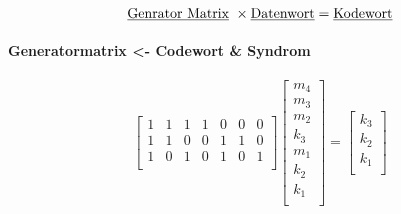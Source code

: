 \documentclass[a4paper]{scrartcl}
\begin{document}
					\[ \text{\underline{Genrator Matrix} }\times \text{\underline{Datenwort}} = \text{\underline{Kodewort}} \]
					\paragraph{Generatormatrix <- Codewort \& Syndrom}
					\[
						\begin{bmatrix}
							1&1&1&1&0&0&0\\
							1&1&0&0&1&1&0\\
							1&0&1&0&1&0&1\\
						\end{bmatrix}
						\begin{bmatrix}
							m_4\\
							m_3\\
							m_2\\
							k_3\\
							m_1\\
							k_2\\
							k_1\\
						\end{bmatrix}
						=
						\begin{bmatrix}
							k_3\\
							k_2\\
							k_1\\
						\end{bmatrix}
					\]
					
\end{document}
